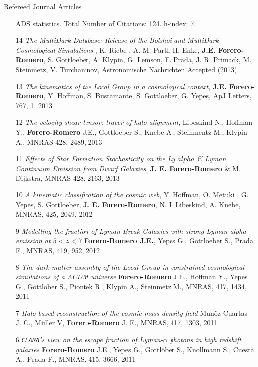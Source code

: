 \documentclass[9pt]{article}
\begin{document}
\indent
Refereed Journal Articles
\begin{enumerate}
\item[] ADS statistics. Total Number of Citations: 124. h-index: 7.
\item[14]{\it The MultiDark Database: Release of the Bolshoi and MultiDark Cosmological Simulations} , K. Riebe , A. M. Partl, H. Enke, {\bf J.E. Forero-Romero}, S. Gottloeber, A. Klypin, G. Lemson, F. Prada, J. R. Primack, M. Steinmetz, V. Turchaninov, Astronomische Nachrichten Accepted (2013).

\item[13] {\it The kinematics of the Local Group in a cosmological context}, 
{\bf J.E. Forero-Romero}, Y. Hoffman, S. Bustamante, S. Gottloeber, G. Yepes, ApJ Letters, 767, 1, 2013


\item[12] {\it The velocity shear tensor: tracer of halo alignment}, Libeskind N., Hoffman Y., {\bf Forero-Romero} J.E., Gottloeber S., Knebe A., Steinmentz M., Klypin A., MNRAS 428, 2489, 2013

\item[11] {\it Effects of Star Formation Stochasticity on the Ly $alpha$ \& Lyman Continuum Emission from Dwarf Galaxies}, {\bf J. E. Forero-Romero} \& M. Dijkstra, MNRAS 428, 2163, 2013

\item[10] {\it A kinematic classification of the cosmic web}, Y. Hoffman, O. Metuki , G. Yepes, S. Gottloeber, {\bf J. E. Forero-Romero}, N. I. Libeskind, A. Knebe, MNRAS, 425, 2049, 2012

\item[9] {\it Modelling the fraction of Lyman Break Galaxies with strong Lyman-alpha emission at $5 < z < 7$} {\bf Forero-Romero J.E.}, Yepes G., Gottloeber S., Prada F., MNRAS, 419, 952, 2012

\item [8]
{\it The dark matter assembly of the Local Group in constrained cosmological
  simulations of a $\Lambda$CDM universe} {\bf Forero-Romero} J.E., Hoffman Y., Yepes G., Gottl\"ober S.,
  Piontek R., Klypin A., Steinmetz M., 
MNRAS, 417, 1434, 2011

\item[7] 
{\it Halo based reconstruction of the cosmic mass density field}
Mun\~oz-Cuartas J. C., M\"uller V, {\bf Forero-Romero} J. E.,
MNRAS, 417, 1303, 2011

\item [6]
{\it {\tt CLARA}'s view on the escape fraction of Lyman-$\alpha$ photons in
  high redshift galaxies}
{\bf Forero-Romero} J.E., Yepes G., Gottl\"ober S., Knollmann S., Cuesta A., Prada F.,  
MNRAS, 415, 3666, 2011


\end{enumerate}
\end{document}
